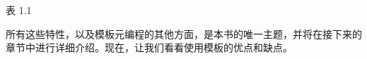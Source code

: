 \begin{center}
表 1.1
\end{center}

所有这些特性，以及模板元编程的其他方面，是本书的唯一主题，并将在接下来的章节中进行详细介绍。现在，让我们看看使用模板的优点和缺点。






















